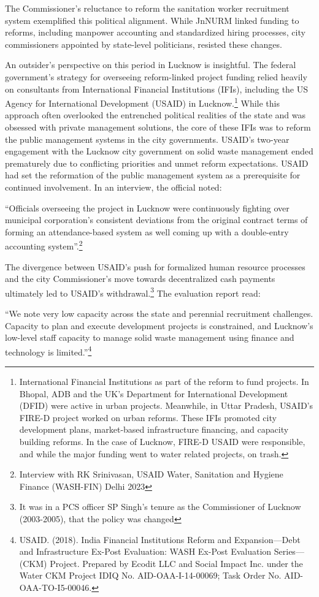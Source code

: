 The Commissioner's reluctance to reform the sanitation worker recruitment system exemplified this political alignment. While JnNURM linked funding to reforms, including manpower accounting and standardized hiring processes, city commissioners appointed by state-level politicians, resisted these changes.

An outsider's perspective on this period in Lucknow is insightful. The federal government's strategy for overseeing reform-linked project funding relied heavily on consultants from International Financial Institutions (IFIs), including the US Agency for International Development (USAID) in Lucknow.\footnote{International Financial Institutions as part of the reform to fund projects. In Bhopal, ADB and the UK's Department for International Development (DFID) were active in urban projects. Meanwhile, in Uttar Pradesh, USAID's FIRE-D project worked on urban reforms. These IFIs promoted city development plans, market-based infrastructure financing, and capacity building reforms. In the case of Lucknow, FIRE-D USAID were responsible, and while the major funding went to water related projects, on trash.} While this approach often overlooked the entrenched political realities of the state and was obsessed with private management solutions, the core of these IFIs was to reform the public management systems in the city governments. USAID's two-year engagement with the Lucknow city government on solid waste management ended prematurely due to conflicting priorities and unmet reform expectations. USAID had set the reformation of the public management system as a prerequisite for continued involvement. In an interview, the official noted:

``Officials overseeing the project in Lucknow were continuously fighting over municipal corporation's consistent deviations from the original contract terms of forming an attendance-based system as well coming up with a double-entry accounting system''.\footnote{Interview with RK Srinivasan, USAID Water, Sanitation and Hygiene Finance (WASH-FIN) Delhi 2023}

The divergence between USAID's push for formalized human resource processes and the city Commissioner's move towards decentralized cash payments ultimately led to USAID's withdrawal.\footnote{It was in a PCS officer SP Singh's tenure as the Commissioner of Lucknow (2003-2005), that the policy was changed} The evaluation report read:

``We note very low capacity across the state and perennial recruitment challenges. Capacity to plan and execute development projects is constrained, and Lucknow's low-level staff capacity to manage solid waste management using finance and technology is limited.''\footnote{USAID. (2018). India Financial Institutions Reform and Expansion—Debt and Infrastructure Ex-Post Evaluation: WASH Ex-Post Evaluation Series—(CKM) Project. Prepared by Ecodit LLC and Social Impact Inc. under the Water CKM Project IDIQ No. AID-OAA-I-14-00069; Task Order No. AID-OAA-TO-I5-00046.}

